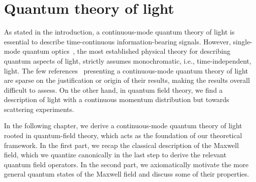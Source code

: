 \chapter{Quantum theory of light}\label{ch:light}

As stated in the introduction, a continuous-mode quantum theory of light is essential to describe time-continuous information-bearing signals.
However, single-mode quantum optics~\cite{Fox2006,Gerry2005,Haroche2006,Meystre2007}, the most established physical theory for describing quantum aspects of light, strictly assumes monochromatic, i.e., time-independent, light.
The few references~\cite{Barnett2002,Loudon2000} presenting a continuous-mode quantum theory of light are sparse on the justification or origin of their results, making the results overall difficult to assess.
On the other hand, in quantum field theory, we find a description of light with a continuous momentum distribution but towards scattering experiments.

In the following chapter, we derive a continuous-mode quantum theory of light rooted in quantum-field theory, which acts as the foundation of our theoretical framework.
In the first part, we recap the classical description of the Maxwell field, which we quantize canonically in the last step to derive the relevant quantum field operators.
In the second part, we axiomatically motivate the more general quantum states of the Maxwell field and discuss some of their properties.
